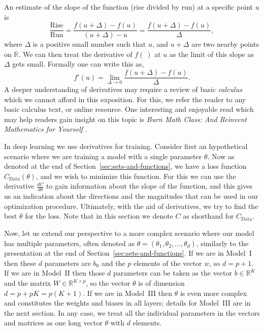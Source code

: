 \documentclass[12pt]{article}
\begin{document}
An estimate of the slope of the function (rise divided by run) at a specific point $u$ is
%
\[
\frac{\textrm{Rise}}{\textrm{Run}} = \frac{f(u+\Delta) - f(u)}{(u+\Delta) - u} = \frac{f(u+\Delta) - f(u)}{\Delta},  
\]
%
where $\Delta$ is a positive small number such that $u$, and $u + \Delta$ are two nearby points on ${\mathbb R
}$. We can then treat the derivative of $f(~)$ at $u$ as the limit of this slope as $\Delta$ gets small. Formally one can write this as,
%
\[
f'(u) = \lim_{\Delta \to 0} \frac{f(u+\Delta) - f(u)}{\Delta}.
\]
%
A deeper understanding of derivatives may require a review of basic {\em calculus} which we cannot afford in this exposition. For this, we refer the reader to any basic calculus text, or online resource. One interesting and enjoyable read which may help readers gain insight on this topic is {\em Burn Math Class: And Reinvent Mathematics for Yourself} \cite{wilkes2016burn}.

In deep learning we use derivatives for training. Consider first an hypothetical scenario where we are training a model with a single parameter $\theta$. Now as denoted at the end of Section~\ref{sec:sets-and-functions}, we have a loss function $C_{\textrm{Data}}(\theta)$, and we wish to minimize this function. For this we can use the derivative $\frac{dC}{d\theta}$ to gain information about the slope of the function, and this gives us an indication about the directions and the magnitudes that can be used in our optimization procedure. Ultimately, with the aid of derivatives, we try to find the best $\theta$ for the loss. Note that in this section we denote $C$ as shorthand for $C_{\textrm{Data}}$.

Now, let us extend our perspective to a more complex scenario where our model has multiple parameters, often denoted as $\theta = (\theta_1, \theta_2, ..., \theta_d)$, similarly to the presentation at the end of Section~\ref{sec:sets-and-functions}. If we are in Model~I then these $d$ parameters are $b_0$ and the $p$ elements of the vector $w$, so $d=p+1$. If we are in Model~II then those $d$ parameters can be taken as the vector $b \in {\mathbb R}^K$ and the matrix $W \in {\mathbb R}^{K\times p}$, so the vector $\theta$ is of dimension $d = p + pK = p(K+1)$. If we are in Model~III then $\theta$ is even more complex and constitutes the weights and biases in all layers; details for Model~III are in the next section. In any case, we treat all the individual parameters in the vectors and matrices as one long vector $\theta$ with $d$ elements.  
\end{document}
